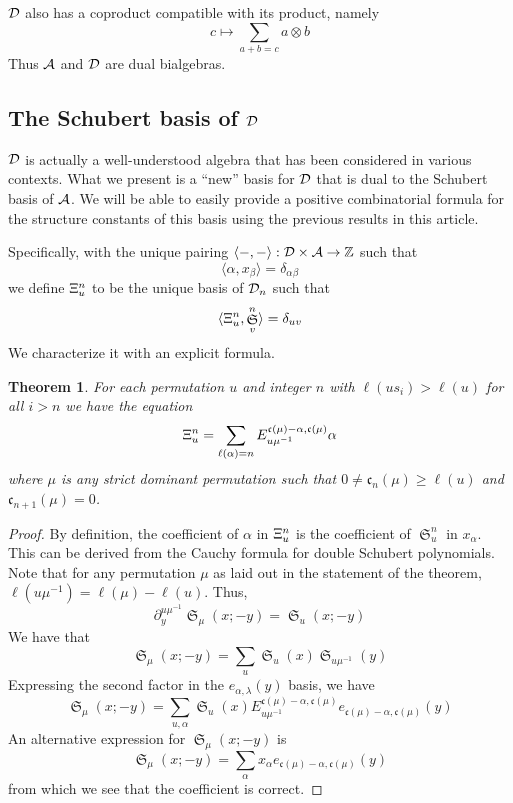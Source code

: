 \documentclass{amsart}
\newtheorem{theorem}{Theorem}[section]
\theoremstyle{definition}
\theoremstyle{remark}
\numberwithin{equation}{subsection}
\DeclareMathOperator{\sch}{\mathfrak{S}}
\newcommand{\code}{\mathfrak{c}}
\begin{document}
$\mathcal{D}$ also has a coproduct compatible with its product, namely
$$c\mapsto \sum_{a+b=c} a\otimes b$$
Thus $\mathcal{A}$ and $\mathcal{D}$ are dual bialgebras. 

\subsection{The Schubert basis of $\mathcal{D}$}

$\mathcal{D}$ is actually a well-understood algebra that has been considered in various contexts. What we present is a ``new'' basis for $\mathcal{D}$ that is dual to the Schubert basis of $\mathcal{A}$. We will be able to easily provide a positive combinatorial formula for the structure constants of this basis using the previous results in this article.

Specifically, with the unique pairing $\langle -,-\rangle:\mathcal{D}\times \mathcal{A}\to\mathbb{Z}$ such that
$$\langle \alpha,x_\beta\rangle = \delta_{\alpha\beta}$$
we define $\Xi_u^n$ to be the unique basis of $\mathcal{D}_n$ such that
$$\langle \dsch_u^n,\sch_v^n\rangle = \delta_{uv}$$
We characterize it with an explicit formula.

\begin{theorem}
	For each permutation $u$ and integer $n$ with $\ell(us_i)>\ell(u)$ for all $i>n$ we have the equation
	$$\dsch_u^{n} = \sum_{\ell(\alpha)=n} E^{\code(\mu)-\alpha,\code(\mu)}_{u\mu^{-1}}\alpha$$
	where $\mu$ is any strict dominant permutation such that $0\neq \code_n(\mu) \geq \ell(u)$ and $\code_{n+1}(\mu)=0$.
\end{theorem}
\begin{proof}
	By definition, the coefficient of $\alpha$ in $\Xi_u^n$ is the coefficient of $\sch_u^n$ in $x_\alpha$. This can be derived from the Cauchy formula for double Schubert polynomials. Note that for any permutation $\mu$ as laid out in the statement of the theorem, $\ell(u\mu^{-1})=\ell(\mu)-\ell(u)$. Thus,
	$$\partial_y^{u\mu^{-1}}\sch_\mu(x;-y) = \sch_u(x;-y)$$
	We have that
	$$\sch_\mu(x;-y)=\sum_u \sch_u(x)\sch_{u\mu^{-1}}(y)$$
	Expressing the second factor in the $e_{\alpha,\lambda}(y)$ basis, we have
	$$\sch_\mu(x;-y)=\sum_{u,\alpha} \sch_u(x)E_{u\mu^{-1}}^{\code(\mu)-\alpha,\code(\mu)}e_{\code(\mu)-\alpha,\code(\mu)}(y)$$
	An alternative expression for $\sch_\mu(x;-y)$ is
	$$\sch_\mu(x;-y)=\sum_{\alpha} x_\alpha e_{\code(\mu)-\alpha,\code(\mu)}(y)$$
	from which we see that the coefficient is correct.
\end{proof}
\end{document}
